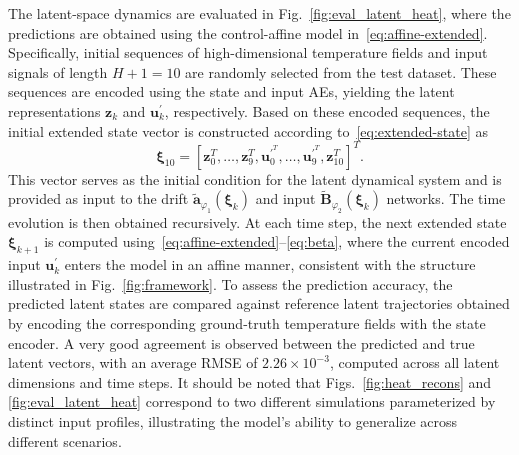 \documentclass{article}
\begin{document}
The latent-space dynamics are evaluated in Fig.~\ref{fig:eval_latent_heat}, where the predictions are obtained using the control-affine model in~\eqref{eq:affine-extended}.
Specifically, initial sequences of high-dimensional temperature fields and input signals of length $H+1=10$ are randomly selected from the test dataset.
These sequences are encoded using the state and input AEs, yielding the latent representations $\mathbf{z}_k$ and $\mathbf{u}_k^\prime$, respectively.
Based on these encoded sequences, the initial extended state vector is constructed according to~\eqref{eq:extended-state} as 
\[
    \boldsymbol{\xi}_{10}=[\mathbf{z}_0^T,\ldots,\mathbf{z}_9^T,\mathbf{u}_{0}^{\prime^T},\ldots,\mathbf{u}_9^{\prime^T},\mathbf{z}_{10}^T]^T.
\]
This vector serves as the initial condition for the latent dynamical system and is provided as input to the drift $\widetilde{\mathbf{a}}_{\varphi_1}(\boldsymbol{\xi}_k)$ and input $\widetilde{\mathbf{B}}_{\varphi_2}(\boldsymbol{\xi}_k)$ networks.
The time evolution is then obtained recursively. At each time step, the next extended state $\boldsymbol{\xi}_{k+1}$ is computed using~\eqref{eq:affine-extended}–\eqref{eq:beta}, where the current encoded input $\mathbf{u}_{k}^{\prime}$ enters the model in an affine manner, consistent with the structure illustrated in Fig.~\ref{fig:framework}.
To assess the prediction accuracy, the predicted latent states are compared against reference latent trajectories obtained by encoding the corresponding ground-truth temperature fields with the state encoder.
A very good agreement is observed between the predicted and true latent vectors, with an average RMSE of $2.26 \times 10^{-3}$, computed across all latent dimensions and time steps.
It should be noted that Figs.~\ref{fig:heat_recons} and \ref{fig:eval_latent_heat} correspond to two different simulations parameterized by distinct input profiles, illustrating the model's ability to generalize across different scenarios.
\end{document}

